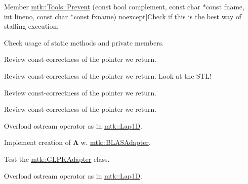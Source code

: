 \begin{DoxyRefList}
\hypertarget{todo__todo000023}{}%
Member \hyperlink{classmtk_1_1Tools_a332324c6f25e66be9dff48c5987a3b9f}{mtk\+:\+:Tools\+:\+:Prevent} (const bool complement, const char $\ast$const fname, int lineno, const char $\ast$const fxname) noexcept]Check if this is the best way of stalling execution.  
\item[\label{todo__todo000024}%
\hypertarget{todo__todo000024}{}%
Member \hyperlink{classmtk_1_1Tools_a04a60458594336ee1badff79b8a9a77f}{mtk\+:\+:Tools\+:\+:test\+\_\+number\+\_\+} ]Check usage of static methods and private members.  
\item[\label{todo__todo000007}%
\hypertarget{todo__todo000007}{}%
Member \hyperlink{classmtk_1_1UniStgGrid1D_aa1999580cb98c19950e951510871cc90}{mtk\+:\+:Uni\+Stg\+Grid1\+D\+:\+:discrete\+\_\+domain\+\_\+x} () const ]Review const-\/correctness of the pointer we return.  
\item[\label{todo__todo000008}%
\hypertarget{todo__todo000008}{}%
Member \hyperlink{classmtk_1_1UniStgGrid1D_acf28d702f6e702599986afcb253bbfc1}{mtk\+:\+:Uni\+Stg\+Grid1\+D\+:\+:discrete\+\_\+field\+\_\+u} ()]Review const-\/correctness of the pointer we return. Look at the S\+T\+L!  
\item[\label{todo__todo000010}%
\hypertarget{todo__todo000010}{}%
Member \hyperlink{classmtk_1_1UniStgGrid2D_ab2f70cf5cd0a2d5486992d9f2f8baa4a}{mtk\+:\+:Uni\+Stg\+Grid2\+D\+:\+:discrete\+\_\+domain\+\_\+x} () const ]Review const-\/correctness of the pointer we return.  
\item[\label{todo__todo000011}%
\hypertarget{todo__todo000011}{}%
Member \hyperlink{classmtk_1_1UniStgGrid2D_ac33a58d65105550dcf6f6b92b48b5105}{mtk\+:\+:Uni\+Stg\+Grid2\+D\+:\+:discrete\+\_\+domain\+\_\+y} () const ]Review const-\/correctness of the pointer we return.  
\item[\label{todo__todo000016}%
\hypertarget{todo__todo000016}{}%
File \hyperlink{mtk__div__1d_8cc}{mtk\+\_\+div\+\_\+1d.cc} ]Overload ostream operator as in \hyperlink{classmtk_1_1Lap1D}{mtk\+::\+Lap1\+D}.

Implement creation of $ \mathbf{\Lambda}$ w. \hyperlink{classmtk_1_1BLASAdapter}{mtk\+::\+B\+L\+A\+S\+Adapter}.  
\item[\label{todo__todo000025}%
\hypertarget{todo__todo000025}{}%
File \hyperlink{mtk__glpk__adapter__test_8cc}{mtk\+\_\+glpk\+\_\+adapter\+\_\+test.cc} ]Test the \hyperlink{classmtk_1_1GLPKAdapter}{mtk\+::\+G\+L\+P\+K\+Adapter} class.  
\item[\label{todo__todo000018}%
\hypertarget{todo__todo000018}{}%
File \hyperlink{mtk__grad__1d_8cc}{mtk\+\_\+grad\+\_\+1d.cc} ]Overload ostream operator as in \hyperlink{classmtk_1_1Lap1D}{mtk\+::\+Lap1\+D}.


\end{DoxyRefList}

